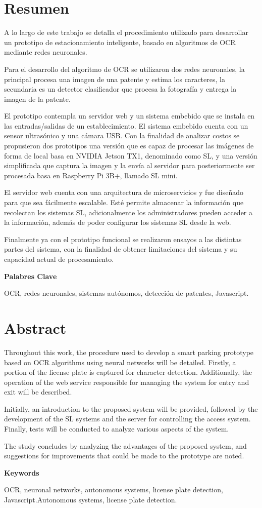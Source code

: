 \chapter*{Resumen}
A lo largo de este trabajo se detalla el procedimiento utilizado para desarrollar un prototipo de estacionamiento inteligente, basado en algoritmos de OCR mediante redes neuronales.

Para el desarrollo del algoritmo de OCR se utilizaron dos redes neuronales, la principal procesa una imagen de una patente y estima los caracteres,
la secundaria es un detector clasificador que procesa la fotografía y entrega la imagen de la patente.

El prototipo contempla un servidor web y un sistema embebido que se instala en las entradas/salidas de un establecimiento.
El sistema embebido cuenta con un sensor ultrasónico y una cámara USB.
Con la finalidad de analizar costos se propusieron dos prototipos una versión que es capaz de procesar las imágenes de forma de local basa en NVIDIA Jetson TX1, denominado como SL, y una versión simplificada que captura la imagen y la envía al servidor para posteriormente ser procesada basa en Raspberry Pi 3B+, llamado SL mini.

El servidor web cuenta con una arquitectura de microservicios y fue diseñado para que sea fácilmente escalable. Esté permite almacenar la información que recolectan los sistemas SL, adicionalmente los administradores pueden acceder a la información, además de poder configurar los sistemas SL desde la web.

Finalmente ya con el prototipo funcional se realizaron ensayos a las distintas partes del sistema, con la finalidad de obtener limitaciones del sistema y su capacidad actual de procesamiento.

\vspace*{\fill}
\noindent \textbf{Palabres Clave}

OCR, redes neuronales, sistemas autónomos, detección de patentes, Javascript.

\chapter*{Abstract}
Throughout this work, the procedure used to develop a smart parking prototype based on OCR algorithms using neural networks will be detailed. Firstly, a portion of the license plate is captured for character detection. Additionally, the operation of the web service responsible for managing the system for entry and exit will be described.

Initially, an introduction to the proposed system will be provided, followed by the development of the SL systems and the server for controlling the access system. Finally, tests will be conducted to analyze various aspects of the system.

The study concludes by analyzing the advantages of the proposed system, and suggestions for improvements that could be made to the prototype are noted.

\vspace*{\fill}
\noindent \textbf{Keywords}

OCR, neuronal networks, autonomous systems, license plate detection, Javascript.Autonomous systems, license plate detection.